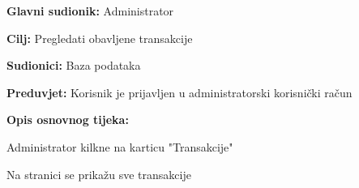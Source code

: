 		\noindent {}
		\begin{packed_item}
		
			\item \textbf{Glavni sudionik: } Administrator
			\item  \textbf{Cilj: } Pregledati obavljene transakcije
			\item  \textbf{Sudionici: } Baza podataka
			\item  \textbf{Preduvjet: } Korisnik je prijavljen u administratorski korisnički račun
			\item  \textbf{Opis osnovnog tijeka:}
		
			\item[] \begin{packed_enum}
			
				\item Administrator kilkne na karticu "Transakcije"
				\item Na stranici se prikažu sve transakcije
			\end{packed_enum}
		
		\end{packed_item}

